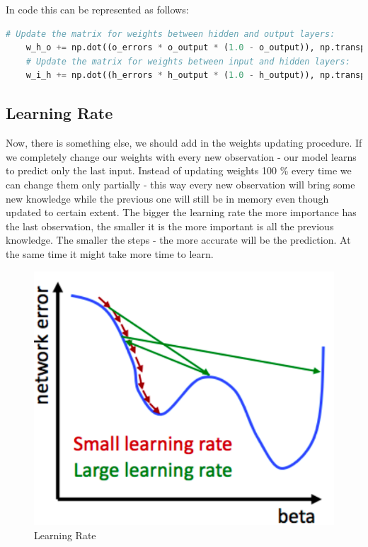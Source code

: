 In code this can be represented as follows:

\begin{lstlisting}[language=Python]
    # Update the matrix for weights between hidden and output layers:
    w_h_o += np.dot((o_errors * o_output * (1.0 - o_output)), np.transpose(h_output)) # 2 can be omitted as being related to the learning rate.
    # Update the matrix for weights between input and hidden layers:
    w_i_h += np.dot((h_errors * h_output * (1.0 - h_output)), np.transpose(input))"
\end{lstlisting}

\subsection{Learning Rate}

Now, there is something else, we should add in the weights updating procedure. If we completely change our weights with every new observation - our model learns to predict only the last input. Instead of updating weights 100 \% every time we can change them only partially - this way every new observation will bring some new knowledge while the previous one will still be in memory even though updated to certain extent. The bigger the learning rate the more importance has the last observation, the smaller it is the more important is all the previous knowledge. The smaller the steps - the more accurate will be the prediction. At the same time it might take more time to learn.

\begin{figure}[H]
    \includegraphics[width=\linewidth]{pics/learning_rate.png}
    \caption{\label{fig:bp} Learning Rate}
\end{figure}

